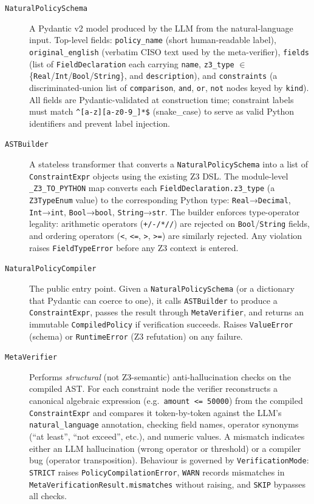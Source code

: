 \documentclass[12pt,a4paper,oneside]{report}
\newcommand{\code}[1]{\texttt{#1}}           %
\begin{document}
\begin{description}

\item[\code{NaturalPolicySchema}]
  A Pydantic v2 model produced by the LLM from the natural-language input.
  Top-level fields: \code{policy\_name} (short human-readable label),
  \code{original\_english} (verbatim CISO text used by the meta-verifier),
  \code{fields} (list of \code{FieldDeclaration} each carrying \code{name},
  \code{z3\_type} $\in$ \{\code{Real}/\code{Int}/\code{Bool}/\code{String}\},
  and \code{description}), and \code{constraints} (a discriminated-union list
  of \code{comparison}, \code{and}, \code{or}, \code{not} nodes keyed by
  \code{kind}).  All fields are Pydantic-validated at construction time;
  constraint labels must match \code{\^{}[a-z][a-z0-9\_]*\$} (snake\_case)
  to serve as valid Python identifiers and prevent label injection.

\item[\code{ASTBuilder}]
  A stateless transformer that converts a \code{NaturalPolicySchema} into a
  list of \code{ConstraintExpr} objects using the existing Z3 DSL.  The
  module-level \code{\_Z3\_TO\_PYTHON} map converts each
  \code{FieldDeclaration.z3\_type} (a \code{Z3TypeEnum} value) to the
  corresponding Python type: \code{Real}→\code{Decimal}, \code{Int}→\code{int},
  \code{Bool}→\code{bool}, \code{String}→\code{str}.  The builder enforces
  type-operator legality: arithmetic operators (\code{+/-/*//}) are rejected
  on \code{Bool}/\code{String} fields, and ordering operators
  (\code{<}, \code{<=}, \code{>}, \code{>=}) are similarly rejected.  Any
  violation raises \code{FieldTypeError} before any Z3 context is entered.

\item[\code{NaturalPolicyCompiler}]
  The public entry point.  Given a \code{NaturalPolicySchema} (or a
  dictionary that Pydantic can coerce to one), it calls \code{ASTBuilder}
  to produce a \code{ConstraintExpr}, passes the result through
  \code{MetaVerifier}, and returns an immutable \code{CompiledPolicy} if
  verification succeeds.  Raises \code{ValueError} (schema) or
  \code{RuntimeError} (Z3 refutation) on any failure.

\item[\code{MetaVerifier}]
  Performs \emph{structural} (not Z3-semantic) anti-hallucination checks on
  the compiled AST.  For each constraint node the verifier reconstructs a
  canonical algebraic expression (e.g.\ \code{amount <= 50000}) from the
  compiled \code{ConstraintExpr} and compares it token-by-token against the
  LLM's \code{natural\_language} annotation, checking field names, operator
  synonyms (``at least'', ``not exceed'', etc.), and numeric values.  A
  mismatch indicates either an LLM hallucination (wrong operator or threshold)
  or a compiler bug (operator transposition).  Behaviour is governed by
  \code{VerificationMode}: \code{STRICT} raises \code{PolicyCompilationError},
  \code{WARN} records mismatches in \code{MetaVerificationResult.mismatches}
  without raising, and \code{SKIP} bypasses all checks.


\end{description}
\end{document}
